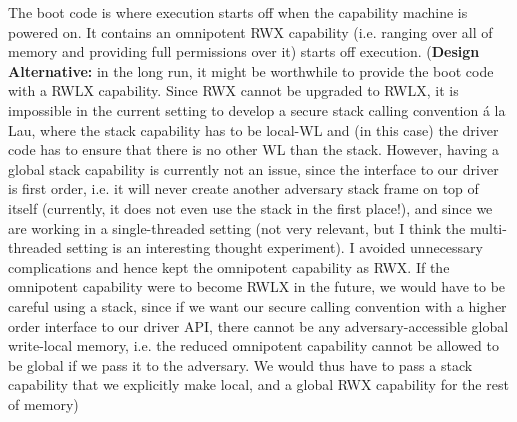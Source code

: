 \documentclass{article}
\begin{document}
The boot code is where execution starts off when the capability machine is
powered on.
It contains an omnipotent RWX capability (i.e. ranging over all of memory and
providing full permissions over it) starts off execution.
(\textbf{Design Alternative:} in the long run, it might be worthwhile to provide
the boot code with a RWLX capability. Since RWX cannot be upgraded to RWLX, it
is impossible in the current setting to develop a secure stack calling
convention \'a la Lau, where the stack capability has to be local-WL and (in this
case) the driver code has to ensure that there is no other WL than the stack.
However, having a global stack capability is currently not an issue, since the interface to our driver is first order, i.e. it will
never create another adversary stack frame on top of itself (currently, it does
not even use the stack in the first place!), and since we are working in a
single-threaded setting (not very relevant, but I think the multi-threaded
setting is an interesting thought experiment). I avoided unnecessary
complications and hence kept the omnipotent capability as RWX. If the omnipotent
capability were to become RWLX in the future, we would have to be careful using
a stack, since if we want our secure calling convention with a higher order
interface to our driver API, there cannot be any adversary-accessible global
write-local memory, i.e. the reduced omnipotent capability cannot be allowed to be global if we pass it to the adversary. We would thus have to pass a stack capability that we explicitly make local, and a global RWX capability for the rest of memory)
\end{document}
